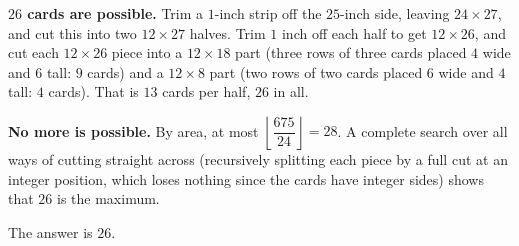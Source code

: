 \textbf{$26$ cards are possible.} Trim a $1$-inch strip off the $25$-inch side, leaving $24\times27$, and cut this into two $12\times27$ halves. Trim $1$ inch off each half to get $12\times26$, and cut each $12\times26$ piece into a $12\times18$ part (three rows of three cards placed $4$ wide and $6$ tall: $9$ cards) and a $12\times8$ part (two rows of two cards placed $6$ wide and $4$ tall: $4$ cards). That is $13$ cards per half, $26$ in all.

\textbf{No more is possible.} By area, at most $\left\lfloor\dfrac{675}{24}\right\rfloor=28$. A complete search over all ways of cutting straight across (recursively splitting each piece by a full cut at an integer position, which loses nothing since the cards have integer sides) shows that $26$ is the maximum.

The answer is $\boxed{26}$.

